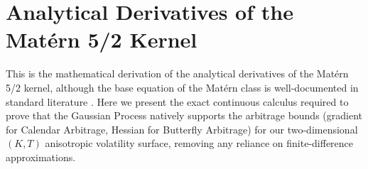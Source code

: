 \documentclass[12pt,oneside]{report}
\theoremstyle{definition}
\theoremstyle{remark}
\begin{document}
\newpage


\section{Analytical Derivatives of the Matérn 5/2 Kernel}
\label{sec:derivatives_matern_kernel)}

This is the mathematical derivation of the analytical derivatives of the Matérn 5/2 kernel, although the base equation of the Matérn class is well-documented in standard literature \cite{rasmussen2006gp}. Here we present the exact continuous calculus required to prove that the Gaussian Process natively supports the arbitrage bounds (gradient for Calendar Arbitrage, Hessian for Butterfly Arbitrage) for our two-dimensional $(K, T)$ anisotropic volatility surface, removing any reliance on finite-difference approximations. 
\end{document}
